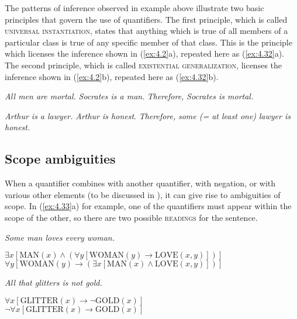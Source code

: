 The patterns of inference observed in example  above illustrate two basic principles that govern the use of quantifiers. The first principle, which is called \textsc{universal instantiation}, states that anything which is true of all members of a particular class is true of any specific member of that class. This is the principle which licenses the inference shown in (\ref{ex:4.2}a), repeated here as (\ref{ex:4.32}a). The second principle, which is called \textsc{existential generalization}, licenses the inference shown in (\ref{ex:4.2}b), repeated here as (\ref{ex:4.32}b).

\settowidth{}
\ea \label{ex:4.32}
\ea  \textit{All men are mortal.}  
\textit{Socrates is a man}.        
\FelixHRule
\textit{Therefore,} \textit{Socrates is mortal.}  
\bigskip

\ex   \textit{Arthur is a lawyer.}                
\textit{Arthur is honest}.                        
\FelixHRule
\textit{Therefore,} \textit{some (= at least one)}  
\hspace{1cm} \textit{lawyer is honest.}
\z \z

\subsection{Scope ambiguities}\label{sec:4.4.2}

When a quantifier combines with another quantifier, with negation, or with various other elements (to be discussed in ), it can give rise to ambiguities of scope. In (\ref{ex:4.33}a) for example, one of the quantifiers must appear within the scope of the other, so there are two possible \textsc{readings} for the sentence.\largerpage


\ea \label{ex:4.33}
\ea \textit{Some man loves every woman.}\\
  \begin{xlisti} 
      \ex $\exists x[\text{MAN}(x) \wedge (\forall y[\text{WOMAN}(y) \rightarrow \text{LOVE}(x,y)])]$\\
      \ex $\forall y[\text{WOMAN}(y) \rightarrow (\exists x[\text{MAN}(x) \wedge \text{LOVE}(x,y)])]$
  \end{xlisti} 
\ex  \textit{All that glitters is not gold.}\\
  \begin{xlisti}
  \ex $\forall x[\text{GLITTER}(x) \rightarrow \neg\text{GOLD}(x)]$\\
  \ex $\neg \forall x[\text{GLITTER}(x) \rightarrow \text{GOLD}(x)]$
  \end{xlisti}
\z \z


